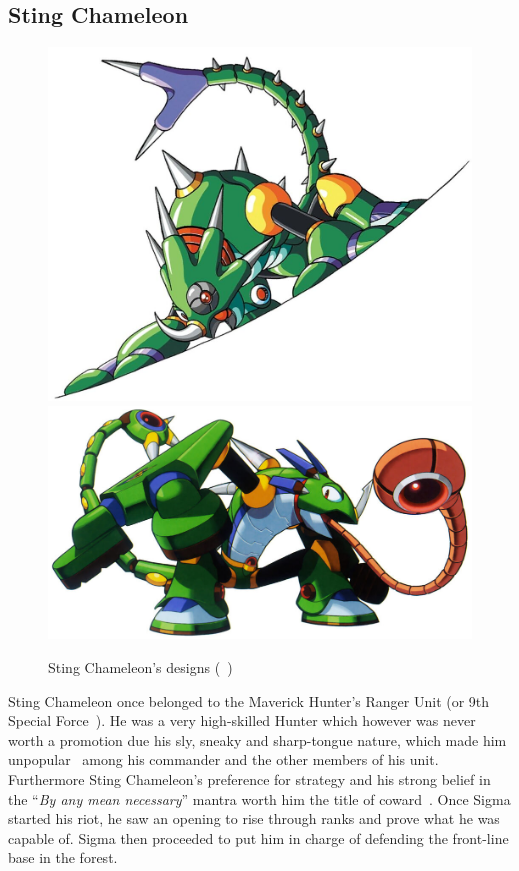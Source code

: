 \subsection{Sting Chameleon}\label{boss:Sting_chameleon}
\begin{figure}[htp]
	\centering
	\includegraphics[width=.49\linewidth]{figures/X1/Sting_chameleon/Stingchameleon.jpg}
	\includegraphics[width=.49\linewidth]{figures/X1/Sting_chameleon/MHXStingChameleon.jpg}
	\caption{Sting Chameleon's designs (~\cite{book:MMX_Complete_art})}
\end{figure}
Sting Chameleon once belonged to the Maverick Hunter's Ranger Unit (or 9th Special Force~\cite{wayback:X_resources}). He was a very high-skilled Hunter which however was never worth a promotion due his sly, sneaky and sharp-tongue nature, which made him unpopular~\cite{Xcoll1:Manual_X1} among his commander and the other members of his unit. Furthermore Sting Chameleon's preference for strategy and his strong belief in the ``\textit{By any mean necessary}'' mantra  worth him the title of coward~\cite{MHX:manual}. Once Sigma started his riot, he saw an opening to rise through ranks and prove what he was capable of. Sigma then proceeded to put him in charge of defending the front-line base in the forest.
